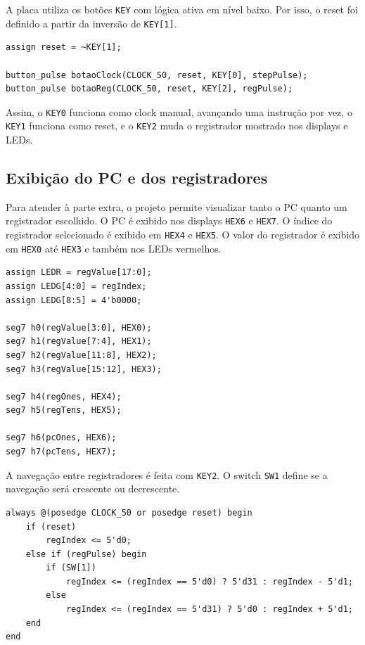\documentclass[12pt,a4paper]{article}
\begin{document}
A placa utiliza os botões \texttt{KEY} com lógica ativa em nível baixo. Por isso, o reset foi definido a partir da inversão de \texttt{KEY[1]}.

\begin{lstlisting}[style=verilogstyle,caption={Mapeamento dos botões principais.}]
assign reset = ~KEY[1];

button_pulse botaoClock(CLOCK_50, reset, KEY[0], stepPulse);
button_pulse botaoReg(CLOCK_50, reset, KEY[2], regPulse);
\end{lstlisting}

Assim, o \texttt{KEY0} funciona como clock manual, avançando uma instrução por vez, o \texttt{KEY1} funciona como reset, e o \texttt{KEY2} muda o registrador mostrado nos displays e LEDs.

\subsection{Exibição do PC e dos registradores}

Para atender à parte extra, o projeto permite visualizar tanto o PC quanto um registrador escolhido. O PC é exibido nos displays \texttt{HEX6} e \texttt{HEX7}. O índice do registrador selecionado é exibido em \texttt{HEX4} e \texttt{HEX5}. O valor do registrador é exibido em \texttt{HEX0} até \texttt{HEX3} e também nos LEDs vermelhos.

\begin{lstlisting}[style=verilogstyle,caption={Exibição do valor do registrador e do índice selecionado.}]
assign LEDR = regValue[17:0];
assign LEDG[4:0] = regIndex;
assign LEDG[8:5] = 4'b0000;

seg7 h0(regValue[3:0], HEX0);
seg7 h1(regValue[7:4], HEX1);
seg7 h2(regValue[11:8], HEX2);
seg7 h3(regValue[15:12], HEX3);

seg7 h4(regOnes, HEX4);
seg7 h5(regTens, HEX5);

seg7 h6(pcOnes, HEX6);
seg7 h7(pcTens, HEX7);
\end{lstlisting}

A navegação entre registradores é feita com \texttt{KEY2}. O switch \texttt{SW1} define se a navegação será crescente ou decrescente.

\begin{lstlisting}[style=verilogstyle,caption={Seleção do registrador exibido na FPGA.}]
always @(posedge CLOCK_50 or posedge reset) begin
    if (reset)
        regIndex <= 5'd0;
    else if (regPulse) begin
        if (SW[1])
            regIndex <= (regIndex == 5'd0) ? 5'd31 : regIndex - 5'd1;
        else
            regIndex <= (regIndex == 5'd31) ? 5'd0 : regIndex + 5'd1;
    end
end
\end{lstlisting}
\end{document}
